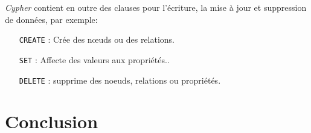   \emph{Cypher} contient en outre des clauses pour l'écriture, la mise
  à jour et suppression de données, par exemple:

  \begin{itemize}
  \item [\texttt{CREATE}]: Crée des nœuds ou des relations.
  \item [\texttt{SET}]: Affecte des valeurs aux propriétés..
  \item [\texttt{DELETE}]: supprime des noeuds, relations ou propriétés.
  \end{itemize}

  \newpage

\section*{Conclusion}
\label{sec:conclusion}
 

